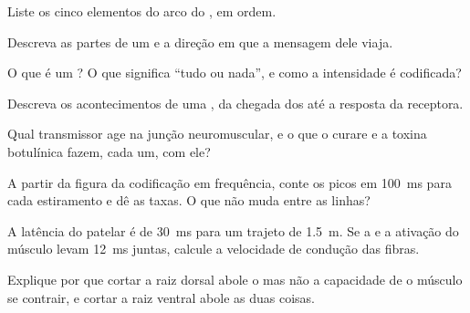 \begin{exercise}[$\star$]\label{exo:g12:stretch-reflex:1}
Liste os cinco elementos do arco do , em ordem.
\end{exercise}

\begin{exercise}[$\star$]\label{exo:g12:stretch-reflex:2}
Descreva as partes de um  e a direção em que a mensagem dele
viaja.
\end{exercise}

\begin{exercise}[$\star$]\label{exo:g12:stretch-reflex:3}
O que é um ? O que significa ``tudo ou nada'', e como
a intensidade é codificada?
\end{exercise}

\begin{exercise}[$\star$]\label{exo:g12:stretch-reflex:4}
Descreva os acontecimentos de uma , da chegada dos  até a resposta da  receptora.
\end{exercise}

\begin{exercise}[$\star$]\label{exo:g12:stretch-reflex:5}
Qual transmissor age na junção neuromuscular, e o que o curare e a
toxina botulínica fazem, cada um, com ele?
\end{exercise}

\begin{exercise}[$\star\star$]\label{exo:g12:stretch-reflex:6}
A partir da figura da codificação em frequência, conte os picos em
\qty{100}{ms} para cada estiramento e dê as taxas. O que não muda entre
as linhas?
\end{exercise}

\begin{exercise}[$\star\star$]\label{exo:g12:stretch-reflex:7}
A latência do  patelar é de \qty{30}{ms} para um trajeto de
\qty{1.5}{m}. Se a  e a ativação do músculo levam \qty{12}{ms}
juntas, calcule a velocidade de condução das fibras.
\end{exercise}

\begin{exercise}[$\star\star$]\label{exo:g12:stretch-reflex:8}
Explique por que cortar a raiz dorsal abole o  mas não a
capacidade de o músculo se contrair, e cortar a raiz ventral abole as
duas coisas.
\end{exercise}

